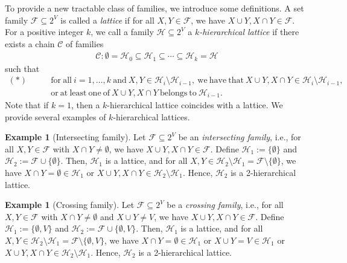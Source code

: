 \documentclass[11pt,letterpaper]{article}
\theoremstyle{plain}
\theoremstyle{definition}
\newtheorem{example}[theorem]{Example}
\begin{document}
To provide a new tractable class of families, we introduce some definitions.
A set family $\mathcal{F}\subseteq 2^V$ is called a \textit{lattice} if for all $X,Y\in \mathcal{F}$, we have $X\cup Y,X\cap Y\in \mathcal{F}$.
For a positive integer $k$, we call a family $\mathcal{H}\subseteq 2^V$ a \textit{$k$-hierarchical lattice} if there exists a chain $\mathcal{C}$ of families
\begin{align*}
\mathcal{C}: \emptyset=\mathcal{H}_0\subseteq \mathcal{H}_1\subseteq \cdots \subseteq \mathcal{H}_k=\mathcal{H}
\end{align*}
such that
\begin{align*}
(*)\qquad
&\mathrm{for\ all\ }i=1,\ldots,k\ \mathrm{and\ }X,Y\in \mathcal{H}_i\setminus \mathcal{H}_{i-1},\ \mathrm{we\ have\ that\ }X\cup Y,X\cap Y\in \mathcal{H}_i\setminus \mathcal{H}_{i-1},\ \\&\mathrm{or\ at\ least\ one\ of\ }X\cup Y, X\cap Y\ \mathrm{belongs\ to\ }\mathcal{H}_{i-1}.
\end{align*}
Note that if $k=1$, then a $k$-hierarchical lattice coincides with a lattice.
We provide several examples of $k$-hierarchical lattices.

\begin{example}[Intersecting family]
\label{ex1}
Let $\mathcal{F}\subseteq 2^V$ be an \textit{intersecting family}, i.e., for all $X,Y\in \mathcal{F}$ with $X\cap Y\ne \emptyset$, we have $X\cup Y,X\cap Y\in \mathcal{F}$.
Define $\mathcal{H}_1:=\{\emptyset\}$ and $\mathcal{H}_2:=\mathcal{F}\cup \{\emptyset\}$.
Then, $\mathcal{H}_1$ is a lattice, and for all $X,Y\in \mathcal{H}_2\setminus \mathcal{H}_1=\mathcal{F}\setminus \{\emptyset\}$, we have $X\cap Y=\emptyset\in \mathcal{H}_1$ or $X\cup Y,X\cap Y\in \mathcal{H}_2\setminus \mathcal{H}_1$.
Hence, $\mathcal{H}_2$ is a 2-hierarchical lattice.
\end{example}

\begin{example}[Crossing family]
\label{ex2}
Let $\mathcal{F}\subseteq 2^V$ be a \textit{crossing family}, i.e., for all $X,Y\in \mathcal{F}$ with $X\cap Y\ne \emptyset$ and $X\cup Y\ne V$, we have $X\cup Y,X\cap Y\in \mathcal{F}$.
Define $\mathcal{H}_1:=\{\emptyset,V\}$ and $\mathcal{H}_2:=\mathcal{F}\cup \{\emptyset,V\}$.
Then, $\mathcal{H}_1$ is a lattice, and for all $X,Y\in \mathcal{H}_2\setminus \mathcal{H}_1=\mathcal{F}\setminus \{\emptyset,V\}$, we have $X\cap Y=\emptyset\in \mathcal{H}_1$ or $X\cup Y=V\in \mathcal{H}_1$ or $X\cup Y,X\cap Y\in \mathcal{H}_2\setminus \mathcal{H}_1$.
Hence, $\mathcal{H}_2$ is a 2-hierarchical lattice.
\end{example}
\end{document}
